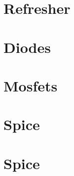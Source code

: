 \documentclass[11pt,twoside,openright]{kaobook}
\begin{document}
\setchapterpreamble[u]{\margintoc}
\chapter{Refresher}


\setchapterpreamble[u]{\margintoc}
\chapter{Diodes}


\setchapterpreamble[u]{\margintoc}
\chapter{Mosfets}


\setchapterpreamble[u]{\margintoc}
\chapter{Spice}


\setchapterpreamble[u]{\margintoc}
\chapter{Spice}


%

%

%

%
%
%
\end{document}
